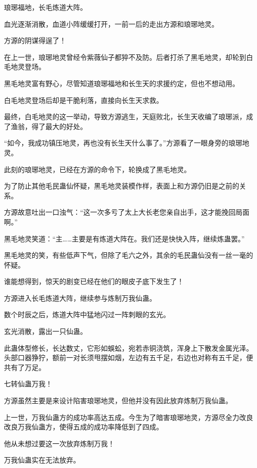 
\begin{this_body}

琅琊福地，长毛炼道大阵。

血光逐渐消散，血道小阵缓缓打开，一前一后的走出方源和琅琊地灵。

方源的阴谋得逞了！

在上一世，琅琊地灵曾经令紫薇仙子都猝不及防。后者打杀了黑毛地灵，却轮到白毛地灵登场。

黑毛地灵富有野心，尽管知道琅琊福地和长生天的求援约定，但也不想动用。

白毛地灵登场后却是干脆利落，直接向长生天求救。

最终，白毛地灵的这一举动，导致方源逃生，天庭败北，长生天收编了琅琊派，成了渔翁，得了最大的好处。

“如今，我成功镇压地灵，再也没有长生天什么事了。”方源看了一眼身旁的琅琊地灵。

此刻的琅琊地灵，已经在方源的命令下，轮换成了黑毛地灵。

为了防止其他毛民蛊仙怀疑，黑毛地灵装模作样，表面上和方源仍旧是之前的关系。

方源故意吐出一口浊气：“这一次多亏了太上大长老您亲自出手，这才能挽回局面啊。”

黑毛地灵笑道：“主……主要是有炼道大阵在。我们还是快快入阵，继续炼蛊罢。”

黑毛地灵的笑，有些低声下气，但除了毛六之外，其余的毛民蛊仙没有一丝一毫的怀疑。

谁能想得到，惊天的剧变已经在他们的眼皮子底下发生了！

方源进入长毛炼道大阵，继续参与炼制万我仙蛊。

数个时辰之后，炼道大阵中猛地闪过一阵刺眼的玄光。

玄光消散，露出一只仙蛊。

此蛊体型修长，长达数丈，它形如蜈蚣，宛若赤铜浇筑，浑身上下散发金属光泽。头部口器狰狞，额前一对长须甩摆如烟，左边有五千足，右边也对称有五千足，便共有了万足。

七转仙蛊万我！

方源虽然主要是来设计陷害琅琊地灵，但他并没有因此放弃炼制万我仙蛊。

上一世，万我仙蛊方的成功率高达五成。今生为了暗害琅琊地灵，方源尽全力改良改良万我仙蛊方，使得五成的成功率降低到了四成。

他从未想过要这一次放弃炼制万我！

万我仙蛊实在无法放弃。


\end{this_body}
